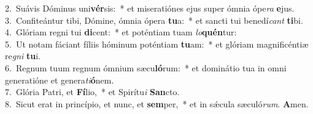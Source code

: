 {2.~}Suávis Dóminus uni\textbf{vér}sis:~* et miseratiónes ejus super ómnia ópe\textit{ra} \textbf{e}jus.\\
{3.~}Confiteántur tibi, Dómine, ómnia ópera \textbf{tu}a:~* et sancti tui benedí\textit{cant} \textbf{ti}bi.\\
{4.~}Glóriam regni tui \textbf{di}cent:~* et poténtiam tuam \textit{lo}\textbf{quén}tur:\\
{5.~}Ut notam fáciant fíliis hóminum poténtiam \textbf{tu}am:~* et glóriam magnificéntiæ re\textit{gni} \textbf{tu}i.\\
{6.~}Regnum tuum regnum ómnium sæcu\textbf{ló}rum:~* et dominátio tua in omni generatióne et genera\textit{ti}\textbf{ó}nem.\\
{7.~}Glória Patri, et \textbf{Fí}lio,~* et Spirítu\textit{i} \textbf{San}cto.\\
{8.~}Sicut erat in princípio, et nunc, et \textbf{sem}per,~* et in sǽcula sæculó\textit{rum}. \textbf{A}men.\\
